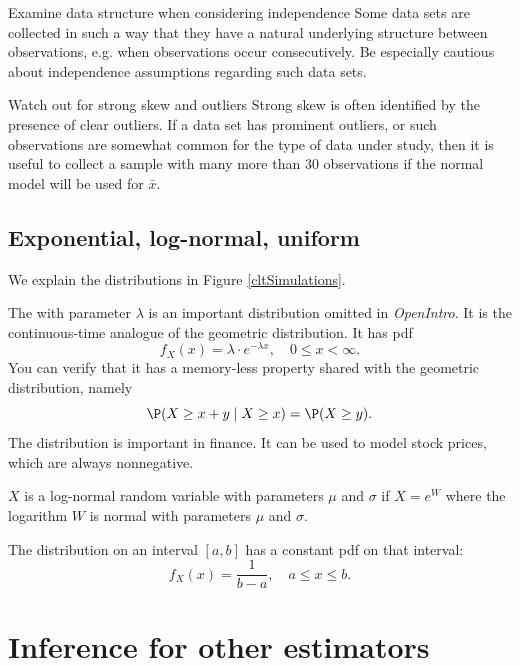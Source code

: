 \begin{caution}
{Examine data structure when considering independence}
{Some data sets are collected in such a way that they have a natural underlying structure between observations, e.g. when observations occur consecutively. Be especially cautious about independence assumptions regarding such data sets.}
\end{caution}

\begin{caution}{Watch out for strong skew and outliers}
{Strong skew is often identified by the presence of clear outliers. If a data set has prominent outliers, or such observations are somewhat common for the type of data under study, then it is useful to collect a sample with many more than 30 observations if the normal model will be used for $\bar{x}$.}
\end{caution}



\subsection{Exponential, log-normal, uniform}
We explain the distributions in Figure \ref{cltSimulations}.

The  with parameter $\lambda$ is an important distribution omitted in \emph{OpenIntro}. It is the continuous-time analogue of the geometric distribution. It has pdf
\[
	f_X(x)=\lambda\cdot e^{-\lambda x},\quad 0\le x<\infty.
\]
You can verify that it has a memory-less property shared with the geometric distribution, namely
\[
	\P(X\ge x+y\mid X\ge x) = \P(X\ge y).
\]
The  distribution is important in finance. It can be used to model stock prices, which are always nonnegative.
\begin{df}\label{lognormal}
$X$ is a log-normal random variable with parameters $\mu$ and $\sigma$ if $X=e^W$ where the logarithm $W$ is normal with parameters $\mu$ and $\sigma$.
\end{df}

The  distribution on an interval $[a,b]$ has a constant pdf on that interval:
\[
	f_X(x)=\frac1{b-a},\quad a\le x\le b.
\]



\section{Inference for other estimators}
\label{aFrameworkForInference}

